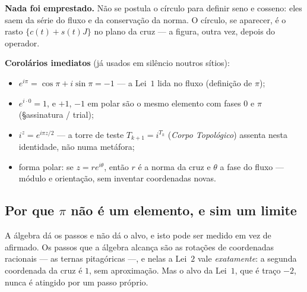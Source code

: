 \documentclass[livro.tex]{subfiles}
\begin{document}
\noindent \textbf{Nada foi emprestado.} Não se postula o círculo para definir seno e
cosseno: eles saem da série do fluxo e da conservação da norma. O círculo, se aparecer,
é o rasto $\{c(t)+s(t)J\}$ no plano da cruz --- a figura, outra vez, depois do operador.

\medskip
\noindent \textbf{Corolários imediatos} (já usados em silêncio noutros sítios):
\begin{itemize}\itemsep2pt
\item $e^{i\pi}=\cos\pi+i\sin\pi=-1$ --- a Lei~$1$ lida no fluxo (definição de $\pi$);
\item $e^{i\cdot0}=1$, e $+1$, $-1$ em polar são o mesmo elemento com fases $0$ e $\pi$
      (\S assinatura / trial);
\item $i^{z}=e^{i\pi z/2}$ --- a torre de teste $T_{k+1}=i^{T_k}$
      (\emph{Corpo Topológico}) assenta nesta identidade, não numa metáfora;
\item forma polar: se $z=r e^{i\theta}$, então $r$ é a norma da cruz e $\theta$ a fase
      do fluxo --- módulo e orientação, sem inventar coordenadas novas.
\end{itemize}


\subsection{Por que $\pi$ não é um elemento, e sim um limite}\label{sec:pilimite}

\noindent A álgebra dá os passos e não dá o alvo, e isto pode ser medido em vez de afirmado. Os
passos que a álgebra alcança são as rotações de coordenadas racionais --- as ternas pitagóricas
---, e nelas a Lei~$2$ vale \emph{exatamente}: a segunda coordenada da cruz é $1$, sem
aproximação. Mas o alvo da Lei~$1$, que é traço $-2$, nunca é atingido por um passo próprio.

\end{document}
